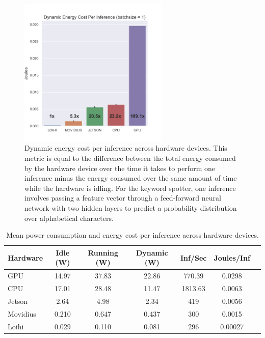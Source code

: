 \documentclass[sigconf, screen]{acmart}
\begin{document}
\begin{figure}[!b]
\centering
    \includegraphics[width=2.8in]{./figures/per_inf_comparison.png}
    \caption{Dynamic energy cost per inference across hardware devices. This metric is equal to the difference between the total energy consumed by the hardware device over the time it takes to perform one inference minus the energy consumed over the same amount of time while the hardware is idling. For the keyword spotter, one inference involves passing a feature vector through a feed-forward neural network with two hidden layers to predict a probability distribution over alphabetical characters.}
\label{per_inf_fig}
\end{figure}


\begin{table}[t!]
\caption{Mean power consumption and energy cost per inference across hardware devices.} 
\vskip 0.15in
\begin{center}
\begin{small}
\begin{sc}
\begin{tabular}{lcccccc}
\hline
Hardware & Idle (W) & Running (W) & Dynamic (W) & Inf/Sec & Joules/Inf \\
\hline
GPU & 14.97 & 37.83 & 22.86 & 770.39 & 0.0298 \\   
CPU & 17.01 & 28.48 & 11.47 & 1813.63 & 0.0063 \\
Jetson & 2.64 & 4.98 & 2.34 & 419 & 0.0056 \\
Movidius & 0.210 & 0.647 & 0.437 & 300 & 0.0015 \\
Loihi & 0.029 & 0.110 & 0.081 & 296 & 0.00027 \\

\hline
\end{tabular}
\end{sc}
\end{small}
\end{center}
\vskip -0.1in
\label{power-table}
\end{table}
\end{document}
